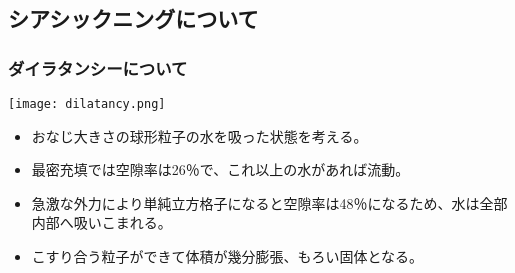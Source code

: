 \documentclass[12pt, dvipdfmx]{beamer}
\begin{document}
\subsection{シアシックニングについて}
\begin{frame}
	\frametitle{ダイラタンシーについて}
		\begin{center}
			\texttt{[image: dilatancy.png]}
		\end{center}
		\small
		\begin{itemize}
			\item おなじ大きさの球形粒子の水を吸った状態を考える。
			\item 最密充填では空隙率は26％で、これ以上の水があれば流動。
			\item 急激な外力により単純立方格子になると空隙率は48％になるため、水は全部内部へ吸いこまれる。
			\item こすり合う粒子ができて体積が幾分膨張、もろい固体となる。
		\end{itemize}
\end{frame}




\end{document}
